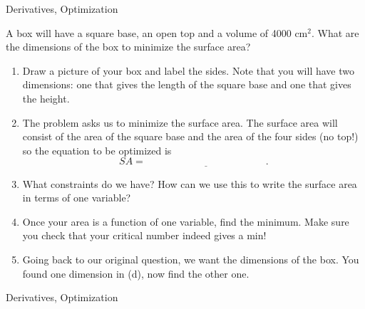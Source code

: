 \begin{tagblock}{Derivatives, Optimization}

\begin{question}

A box will have a square base, an open top and a volume of 4000 $\text{cm}^2$.  What are the dimensions of the box to minimize the surface area?
 \begin{enumerate}
 \item Draw a picture of your box and label the sides.  Note that you will have two dimensions: one that gives the length of the square base and one that gives the height.
 
 \vspace{1.5in}
\item The problem asks us to minimize the surface area.  The surface area will consist of the area of the square base and the area of the four sides (no top!)  so the equation to be optimized is\\
\bigskip
 $$SA=\underline{\hspace{2in}} .$$
 
  \item What constraints do we have?  How can we use this to write the surface area in terms of one variable?
 
 \vspace{1in} 
  \item Once your area is a function of one variable, find the minimum.  Make sure you check that your critical number indeed gives a min!
 
\vfill
 \item Going back to our original question, we want the dimensions of the box.  You found one dimension in (d), now find the other one.
 
 \end{enumerate}



	
\begin{tags}
	   Derivatives, Optimization

\end{tags}
	
\begin{diary}
\end{diary}
	
\begin{solution}
	   
\end{solution}
	
\end{question}

\end{tagblock}

